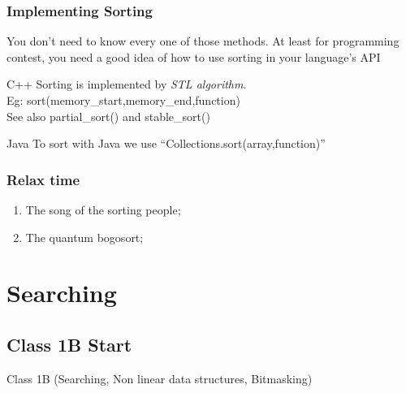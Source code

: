 \documentclass{beamer}
\begin{document}
\begin{frame}
  \frametitle{Implementing Sorting} 

  {\small 
    You don't need to know every one of those methods. At least for
    programming contest, you need a good idea of how to use sorting in
    your language's API

    \medskip
    
  \begin{block}{C++}
    Sorting is implemented by \emph{STL algorithm}.\\
    Eg: sort(memory\_start,memory\_end,function)\\
    See also partial\_sort() and stable\_sort()
  \end{block}
  \begin{block}{Java}
    To sort with Java we use ``Collections.sort(array,function)''    
  \end{block}
  }
\end{frame}

\begin{frame}
  \frametitle{Relax time}
  \begin{enumerate}
  \item The song of the sorting people;
    \vfill
  \item The quantum bogosort;
  \end{enumerate}
\end{frame}

\section{Searching}
\subsection{Class 1B Start}
\begin{frame}
  \maketitle
  \begin{exampleblock}{}
    \begin{center}
      Class 1B (Searching, Non linear data structures, Bitmasking)
    \end{center}
  \end{exampleblock}
\end{frame}
\end{document}
